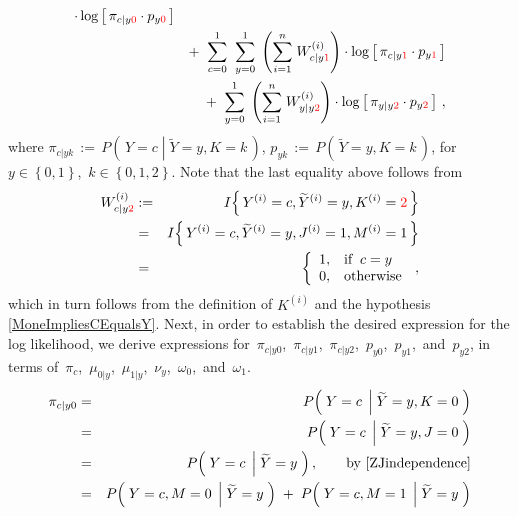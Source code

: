\begin{enumerate}
\begin{eqnarray*}
	\cdot
	\log\left[\,
		\pi_{c \vert y\color{red}0} \cdot p_{y\color{red}0}
	\,\right]
\\
&&
	+ \;\;
	\overset{1}{\underset{c=0}{\sum}}\;\;
	\overset{1}{\underset{y=0}{\sum}}\;
	\left(\overset{n}{\underset{i=1}{\sum}}\;W^{(i)}_{c \vert y{\color{red}1}}\right)
	\cdot
	\log\left[\,
		\pi_{c \vert y\color{red}1} \cdot p_{y\color{red}1}
	\,\right]
\\
&&
	+ \;\;
	\overset{1}{\underset{y=0}{\sum}}\;
	\left(\overset{n}{\underset{i=1}{\sum}}\;W^{(i)}_{y \vert y{\color{red}2}}\right)
	\cdot
	\log\left[\,
		\pi_{y \vert y\color{red}2} \cdot p_{y\color{red}2}
	\,\right]\,,
\end{eqnarray*}
where
\;$\pi_{c \vert yk} \, := \, P\!\left(\,Y=c\;\left\vert\;\widetilde{Y}=y,K=k\right.\,\right)$,
\;$p_{yk} \, := \, P\!\left(\,\widetilde{Y}=y,K=k\,\right)$,
\;for
\;$y \in \left\{0,1\right\}$,
\,$k \in \left\{0,1,2\right\}$.
\;Note that the last equality above follows from
\begin{eqnarray*}
W^{(i)}_{c \vert y{\color{red}2}}
&:=&
	I\!\left\{\,Y^{(i)}=c,\widetilde{Y}^{(i)}=y,K^{(i)}={\color{red}2}\,\right\}
\\
&=&
	I\!\left\{\,Y^{(i)}=c,\widetilde{Y}^{(i)}=y,J^{(i)}=1,M^{(i)}=1\,\right\}
\\
&=&
	\left\{\begin{array}{cl}
		1, & \textnormal{if}\;\; c = y
		\\
		0, & \textnormal{otherwise}
	\end{array}\right.\,,
\end{eqnarray*}
which in turn follows from the definition of $K^{(i)}$ and
the hypothesis \eqref{MoneImpliesCEqualsY}.
Next, in order to establish the desired expression for the log likelihood,
we derive expressions for
\,$\pi_{c \vert y0}$,
\,$\pi_{c \vert y1}$,
\,$\pi_{c \vert y2}$,
\,$p_{y0}$,
\,$p_{y1}$,
\,and
\,$p_{y2}$,
in terms of
\,$\pi_{c}$,
\,$\mu_{0 \vert y}$,
\,$\mu_{1 \vert y}$,
\,$\nu_{y}$,
\,$\omega_{0}$,
\,and
\,$\omega_{1}$.
\begin{eqnarray*}
\pi_{c \vert y0}
&=&
	P\!\left(\;Y=c\;\left\vert\;\widetilde{Y}=y,K=0\right.\,\right)
\\
&=&
	P\!\left(\;Y=c\;\left\vert\;\widetilde{Y}=y,J=0\right.\,\right)
\\
&=&
	P\!\left(\;Y=c\;\left\vert\;\widetilde{Y}=y\right.\,\right),
	\quad\quad
	\textnormal{by \eqref{ZJindependence}}
\\
&=&
	P\!\left(\;Y=c,M=0\;\left\vert\;\widetilde{Y}=y\right.\,\right)
	\;+\;
	P\!\left(\;Y=c,M=1\;\left\vert\;\widetilde{Y}=y\right.\,\right)

\end{eqnarray*}
\end{enumerate}
